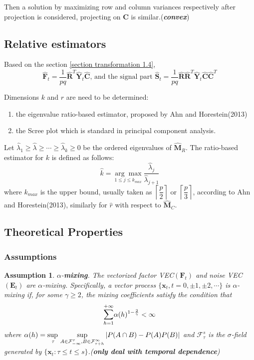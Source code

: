 \documentclass{article}[12pt]
\def\lc{\left\lceil}
\def\rc{\right\rceil}
\newtheorem{assumption}{Assumption}
\begin{document}
\noindent Then a solution by maximizing row and column variances respectively after projection is considered, projecting on $\mathbf{C}$ is similar.(\textbf{\textit{convex}})


\subsection{Relative estimators}
Based on the section \ref{section transformation 1.4}, 
$$\mathbf{\widehat{F}}_t = \dfrac{1}{pq}\mathbf{\widehat{R}}^T\mathbf{\widehat{Y}}_t\mathbf{\widehat{C}}\text{, and the signal part }\mathbf{\widehat{S}}_t = \dfrac{1}{pq}\mathbf{\widehat{R}}\mathbf{\widehat{R}}^T\mathbf{\widehat{Y}}_t\mathbf{\widehat{C}}\mathbf{\widehat{C}}^T$$
 
\noindent Dimensions $k$ and $r$ are need to be determined:
\begin{enumerate}
    \item the eigenvalue ratio-based estimator, proposed by Ahn and Horestein(2013) 
    \item the Scree plot which is standard in principal component analysis. 
\end{enumerate}
\noindent Let $\hat{\lambda}_1 \geq \hat{\lambda} \geq \cdots \geq \hat{\lambda}_k \geq 0$ be the ordered eigenvalues of $\mathbf{\widehat{M}}_R$. The ratio-based estimator for $k$ is defined as follows:
    $$\widehat{k} = \underset{1 \leq j \leq k_{max}}{\arg\max }\dfrac{\widehat{\lambda}_j}{\widehat{\lambda}_{j+1}}$$
    where $k_{max}$ is the upper bound, usually taken as $\lc\dfrac{p}{2}\rc$ or $\lc\dfrac{p}{3}\rc$, according to Ahn and Horestein(2013),  similarly for $\widehat{r}$ with respect to $\mathbf{\widehat{M}}_C$.  

\subsection{Theoretical Properties}

\subsubsection{Assumptions}

\begin{assumption}\label{assumption 1 1.7.1}
    $\alpha$-\textbf{mixing}. \normalfont The vectorized factor VEC$(\mathbf{F}_t)$ and noise VEC$(\mathbf{E}_t)$ are $\alpha$-mixing. Specifically, a vector process $\{\mathbf{x}_t, t=0, \pm 1,\pm 2,\cdots\}$ is $\alpha$-mixing if, for some $\gamma \geq 2$, the mixing coefficients satisfy the condition that
    $$\mathlarger{\sum}_{h=1}^{+\infty} \alpha(h)^{1-\frac{2}{\gamma}} < \infty$$
    where $\alpha(h) =  \adjustlimits\sup_{\tau}\sup_{A \in \mathcal{F}_{-\infty}^{\tau}, B \in \mathcal{F}_{\tau + h}^{\infty}}|P(A\cap B)-P(A)P(B)|$ and $\mathcal{F}_{\tau}^s$ is the $\sigma$-field generated by $\{\mathbf{x}_t:\tau \leq t \leq s\}$.(\textbf{\textit{only deal with temporal dependence}})
\end{assumption}
 
\end{document}
